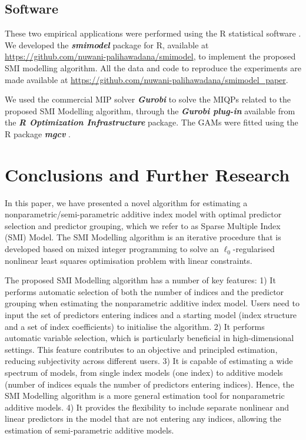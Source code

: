 \documentclass[
  11pt,
  a4paper,
]{article}
\begin{document}
\subsection{Software}\label{software}

These two empirical applications were performed using the R statistical
software \autocite{Rcore}. We developed the \textbf{\emph{smimodel}}
package for R, available at
\url{https://github.com/nuwani-palihawadana/smimodel}, to implement the
proposed SMI modelling algorithm. All the data and code to reproduce the
experiments are made available at
\url{https://github.com/nuwani-palihawadana/smimodel_paper}.

We used the commercial MIP solver \textbf{\emph{Gurobi}}
\autocite{gurobi2023} to solve the MIQPs related to the proposed SMI
Modelling algorithm, through the \textbf{\emph{Gurobi plug-in}}
\autocite[ROI.plugin.gurobi,][]{Schwendinger2023} available from the
\textbf{\emph{R Optimization Infrastructure}}
\autocites[ROI,][]{Hornik2023,Theusl2020} package. The GAMs were fitted
using the R package \textbf{\emph{mgcv}} \autocite{mgcv,Wood2011}.

\section{Conclusions and Further Research}\label{sec-conclusion}

In this paper, we have presented a novel algorithm for estimating a
nonparametric/semi-parametric additive index model with optimal
predictor selection and predictor grouping, which we refer to as Sparse
Multiple Index (SMI) Model. The SMI Modelling algorithm is an iterative
procedure that is developed based on mixed integer programming to solve
an \(\ell_{0}\)-regularised nonlinear least squares optimisation problem
with linear constraints.

The proposed SMI Modelling algorithm has a number of key features: 1) It
performs automatic selection of both the number of indices and the
predictor grouping when estimating the nonparametric additive index
model. Users need to input the set of predictors entering indices and a
starting model (index structure and a set of index coefficients) to
initialise the algorithm. 2) It performs automatic variable selection,
which is particularly beneficial in high-dimensional settings. This
feature contributes to an objective and principled estimation, reducing
subjectivity across different users. 3) It is capable of estimating a
wide spectrum of models, from single index models (one index) to
additive models (number of indices equals the number of predictors
entering indices). Hence, the SMI Modelling algorithm is a more general
estimation tool for nonparametric additive models. 4) It provides the
flexibility to include separate nonlinear and linear predictors in the
model that are not entering any indices, allowing the estimation of
semi-parametric additive models.
\end{document}
